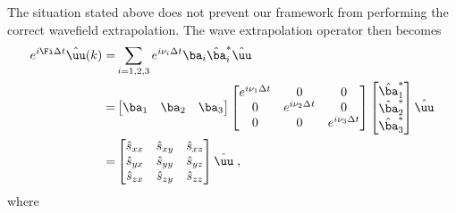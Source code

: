 The situation stated above does not prevent our framework from performing the correct wavefield extrapolation. The wave extrapolation operator then becomes
\begin{eqnarray}
    \label{eq:osop2}
e^{i\Fi \Delta t} \hat{\uu}(k) =&
\sum\limits_{i=1,2,3} e^{i \nu_i \Delta t} \ba_i \hat{\ba}_i^* \hat{\uu} \\ \nonumber
=& \begin{bmatrix} \ba_1 & \ba_2 & \ba_3 \end{bmatrix} 
\begin{bmatrix} 
e^{i \nu_1 \Delta t} & 0 & 0 \\ 
0 & e^{i \nu_2 \Delta t} & 0 \\ 
0 & 0 & e^{i \nu_3 \Delta t} 
\end{bmatrix} 
\begin{bmatrix} \hat{\ba}_1^* \\ \hat{\ba}_2^* \\ \hat{\ba}_3^* \end{bmatrix} \hat{\uu} \\ \nonumber
=& \begin{bmatrix}
    \hat{s}_{xx} & \hat{s}_{xy} & \hat{s}_{xz} \\
    \hat{s}_{yx} & \hat{s}_{yy} & \hat{s}_{yz} \\
    \hat{s}_{zx} & \hat{s}_{zy} & \hat{s}_{zz} \\
\end{bmatrix} \hat{\uu} \;,
\end{eqnarray}
where
